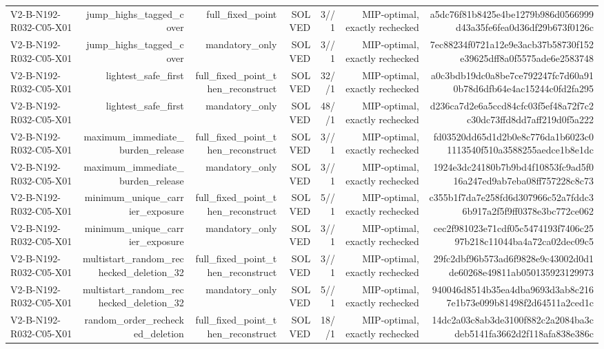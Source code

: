 {\begin{longtable}{lrrrrrr}
V2-B-N192-R032-C05-X01 & jump\_highs\_tagged\_cover & full\_fixed\_point & SOLVED & 3//1 & MIP-optimal, exactly rechecked & a5dc76f81b8425e4be1279b986d0566999d43a35fe6fea0d36df29b673f0126c \\
V2-B-N192-R032-C05-X01 & jump\_highs\_tagged\_cover & mandatory\_only & SOLVED & 3//1 & MIP-optimal, exactly rechecked & 7ec88234f0721a12e9e3acb37b58730f152e39625dff8a0f5575ade6e2583748 \\
V2-B-N192-R032-C05-X01 & lightest\_safe\_first & full\_fixed\_point\_then\_reconstruct & SOLVED & 32//1 & MIP-optimal, exactly rechecked & a0c3bdb19dc0a8be7ce792247fc7d60a910b78d6dfb64e4ac15244c0fd2fa295 \\
V2-B-N192-R032-C05-X01 & lightest\_safe\_first & mandatory\_only & SOLVED & 48//1 & MIP-optimal, exactly rechecked & d236ca7d2e6a5ccd84cfc03f5ef48a72f7c2c30dc73ffd8dd7aff219d0f5a222 \\
V2-B-N192-R032-C05-X01 & maximum\_immediate\_burden\_release & full\_fixed\_point\_then\_reconstruct & SOLVED & 3//1 & MIP-optimal, exactly rechecked & fd03520dd65d1d2b0e8c776da1b6023c01113540f510a3588255aedce1b8e1dc \\
V2-B-N192-R032-C05-X01 & maximum\_immediate\_burden\_release & mandatory\_only & SOLVED & 3//1 & MIP-optimal, exactly rechecked & 1924e3dc24180b7b9bd4f10853fc9ad5f016a247ed9ab7eba08ff757228c8c73 \\
V2-B-N192-R032-C05-X01 & minimum\_unique\_carrier\_exposure & full\_fixed\_point\_then\_reconstruct & SOLVED & 5//1 & MIP-optimal, exactly rechecked & c355b1f7da7e258fd6d307966c52a7fddc36b917a2f5f9ff0378e3bc772ce062 \\
V2-B-N192-R032-C05-X01 & minimum\_unique\_carrier\_exposure & mandatory\_only & SOLVED & 3//1 & MIP-optimal, exactly rechecked & cec2f981023e71cdf05c5474193f7406c2597b218c11044ba4a72ca02dec09c5 \\
V2-B-N192-R032-C05-X01 & multistart\_random\_rechecked\_deletion\_32 & full\_fixed\_point\_then\_reconstruct & SOLVED & 3//1 & MIP-optimal, exactly rechecked & 29fc2dbf96b573ad6f9828e9c43002d0d1de60268e49811ab050135923129973 \\
V2-B-N192-R032-C05-X01 & multistart\_random\_rechecked\_deletion\_32 & mandatory\_only & SOLVED & 5//1 & MIP-optimal, exactly rechecked & 940046d8514b35ea4dba9693d3ab8c2167e1b73e099b81498f2d64511a2ced1c \\
V2-B-N192-R032-C05-X01 & random\_order\_rechecked\_deletion & full\_fixed\_point\_then\_reconstruct & SOLVED & 18//1 & MIP-optimal, exactly rechecked & 14dc2a03c8ab3de3100f882c2a2084ba3cdeb5141fa3662d2f118afa838e386c \\

\end{longtable}}
